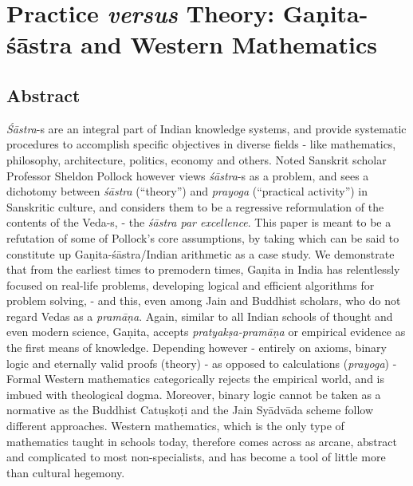 \chapter[Practice {\sl  versus} Theory: Gaṇita-śāstra and...]{Practice {\sl\bfseries versus} Theory: Gaṇita-śāstra and Western Mathematics}\label{chapter3}


\section*{Abstract}

{\sl Śāstra}-s are an integral part of Indian knowledge systems, and provide systematic procedures to accomplish specific objectives in diverse fields - like mathematics, philosophy, architecture, politics, economy and others. Noted Sanskrit scholar Professor Sheldon Pollock however views {\sl śāstra}-s as a problem, and sees a dichotomy between {\sl śāstra} (``theory'') and {\sl prayoga} (``practical activity'') in Sanskritic culture, and considers them to be a regressive reformulation of the contents of the Veda-s, - the {\sl śāstra par excellence}. This paper is meant to be a refutation of some of Pollock's core assumptions, by taking which can be said to constitute up Gaṇita-śāstra/Indian arithmetic as a case study. We demonstrate that from the earliest times to premodern times, Gaṇita in India has relentlessly focused on real-life problems, developing logical and efficient algorithms for problem solving, - and this, even among Jain and Buddhist scholars, who do not regard Vedas as a {\sl pramāṇa}. Again, similar to all Indian schools of thought and even modern science, Gaṇita, accepts {\sl pratyakṣa-pramāṇa} or empirical evidence as the first means of knowledge. Depending however - entirely on axioms, binary logic and eternally valid proofs (theory) - as opposed to calculations ({\sl prayoga}) -  Formal Western mathematics categorically rejects the empirical world, and is imbued with theological dogma. Moreover, binary logic cannot be taken as a normative as the Buddhist Catuṣkoṭi and the Jain Syādvāda scheme follow different approaches. Western mathematics, which is the only type of mathematics taught in schools today, therefore comes across as arcane, abstract and complicated to most non-specialists, and has become a tool of little more than cultural hegemony.  

